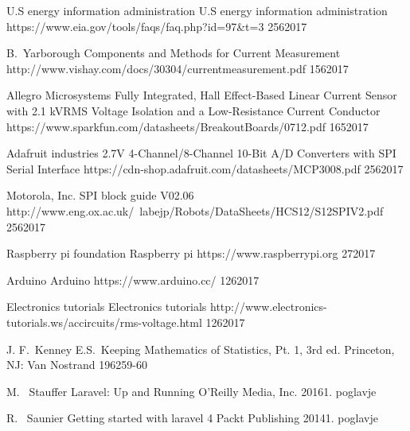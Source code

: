 \documentclass[12pt,a4paper,titlepage,openany]{report}
\begin{document}
 \begin{thebibliography}{99}
\thispagestyle{fancy}

\spletniVirZAvtorjem
    {U.S energy information administration}
    {U.S energy information administration}
    {https://www.eia.gov/tools/faqs/faq.php?id=97\&t=3}
    {25}{6}{2017}


\spletniVirZAvtorjem
    {B.~Yarborough}
    {Components and Methods for Current Measurement}
    {http://www.vishay.com/docs/30304/currentmeasurement.pdf}
    {15}{6}{2017}

\spletniVirZAvtorjem
    {Allegro Microsystems}
    {Fully Integrated, Hall Effect-Based Linear Current Sensor with 2.1 kVRMS Voltage Isolation and a Low-Resistance Current Conductor}
    {https://www.sparkfun.com/datasheets/BreakoutBoards/0712.pdf}
    {16}{5}{2017}

\spletniVirZAvtorjem
    {Adafruit industries}
    {2.7V 4-Channel/8-Channel 10-Bit A/D Converters with SPI Serial Interface}
    {https://cdn-shop.adafruit.com/datasheets/MCP3008.pdf}
    {25}{6}{2017}

\spletniVirZAvtorjem
    {Motorola, Inc.}
    {SPI block guide V02.06}
    {http://www.eng.ox.ac.uk/~labejp/Robots/DataSheets/HCS12/S12SPIV2.pdf}
    {25}{6}{2017}


\spletniVirZAvtorjem
    {Raspberry pi foundation}
    {Raspberry pi}
    {https://www.raspberrypi.org}
    {2}{7}{2017}

\spletniVirZAvtorjem
    {Arduino}
    {Arduino}
    {https://www.arduino.cc/}
    {12}{6}{2017}


\spletniVirZAvtorjem
    {Electronics tutorials}
    {Electronics tutorials}
    {http://www.electronics-tutorials.ws/accircuits/rms-voltage.html}
    {12}{6}{2017}


  \clanekVRevijiVecAvtorjev
    {J. F.~Kenney }{E.S.~Keeping}
    {Mathematics of Statistics, Pt. 1, 3rd ed.}
   { Princeton, NJ: Van Nostrand}
   {1962}{59-60}

  \clanekVRevijiVecAvtorjev
    {M.~ Stauffer}
    {Laravel: Up and Running}
   {O'Reilly Media, Inc.}
   {2016}{1. poglavje}


  \clanekVRevijiVecAvtorjev
    {R.~ Saunier}
    {Getting started with laravel 4}
   {Packt Publishing}
   {2014}{1. poglavje}


\end{thebibliography}
\end{document}
